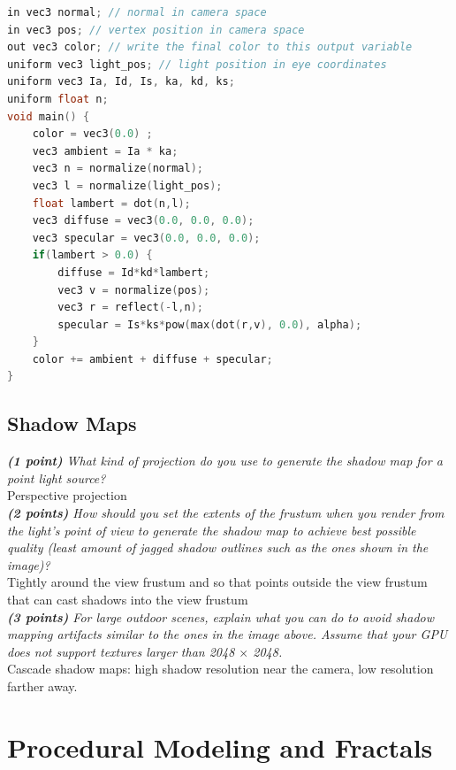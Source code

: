 \documentclass[a4paper,10pt]{article}
\begin{document}
\begin{lstlisting}[language=C]
in vec3 normal; // normal in camera space
in vec3 pos; // vertex position in camera space
out vec3 color; // write the final color to this output variable
uniform vec3 light_pos; // light position in eye coordinates
uniform vec3 Ia, Id, Is, ka, kd, ks; 
uniform float n;
void main() {
	color = vec3(0.0) ;
	vec3 ambient = Ia * ka;
	vec3 n = normalize(normal);
	vec3 l = normalize(light_pos);
	float lambert = dot(n,l);
	vec3 diffuse = vec3(0.0, 0.0, 0.0);
	vec3 specular = vec3(0.0, 0.0, 0.0);
	if(lambert > 0.0) {
		diffuse = Id*kd*lambert;
		vec3 v = normalize(pos);
		vec3 r = reflect(-l,n);
		specular = Is*ks*pow(max(dot(r,v), 0.0), alpha);
	}
	color += ambient + diffuse + specular;
}
\end{lstlisting}

\subsection{Shadow Maps}
\textit{\textbf{(1 point)} What kind of projection do you use to generate the shadow map for a point light source? }\\

Perspective projection\\

\textit{\textbf{(2 points)} How should you set the extents of the frustum when you render from the light's point of view to generate the shadow map to achieve best possible quality (least amount of jagged shadow outlines such as the ones shown in the image)?}\\

Tightly around the view frustum and so that points outside the view frustum that can cast shadows into the view frustum\\

\textit{\textbf{(3 points)} For large outdoor scenes, explain what you can do to avoid shadow mapping artifacts similar to the ones in the image above. Assume that your GPU does not support textures larger than 2048 $\times$ 2048.}\\

Cascade shadow maps: high shadow resolution near the camera, low resolution farther away.
\section{Procedural Modeling and Fractals}
\end{document}
